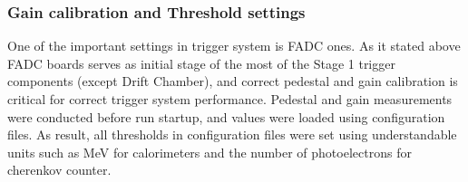 \subsubsection{Gain calibration and Threshold settings}

One of the important settings in trigger system is FADC ones. As it stated above FADC boards serves as initial stage of the most of the Stage 1 trigger components (except Drift Chamber), and correct pedestal and gain calibration is critical for correct trigger system performance. Pedestal and gain measurements were conducted before run startup, and values were loaded using configuration files. As result, all thresholds in configuration files were set using understandable units such as MeV for calorimeters and the number of photoelectrons for cherenkov counter.
